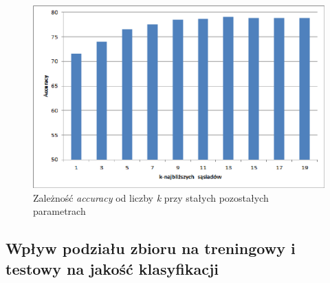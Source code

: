 \documentclass{classrep}
\begin{document}
{{            \begin{figure}[!htbp]
                \centering
                \includegraphics[width=\textwidth]{img/chart/accuracy_k.png}
                \caption{Zależność \emph{accuracy} od liczby \emph{k} przy stałych pozostałych parametrach} \label{chart-k}
            \end{figure}
            \FloatBarrier
        }

        \subsection{Wpływ podziału zbioru na treningowy i testowy na jakość klasyfikacji} {

}}
\end{document}
